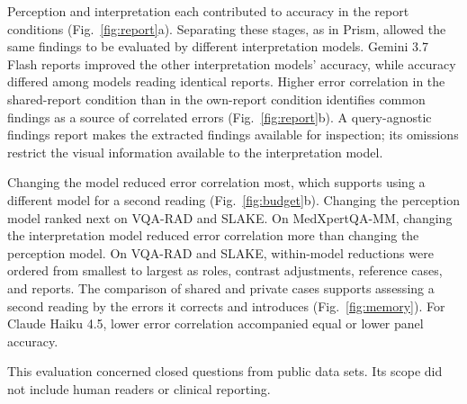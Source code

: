 Perception and interpretation each contributed to accuracy in the report conditions (Fig.~\ref{fig:report}a). Separating these stages, as in Prism, allowed the same findings to be evaluated by different interpretation models.\cite{qiao2024prism} Gemini 3.7 Flash reports improved the other interpretation models' accuracy, while accuracy differed among models reading identical reports. Higher error correlation in the shared-report condition than in the own-report condition identifies common findings as a source of correlated errors (Fig.~\ref{fig:report}b). A query-agnostic findings report makes the extracted findings available for inspection; its omissions restrict the visual information available to the interpretation model.

Changing the model reduced error correlation most, which supports using a different model for a second reading (Fig.~\ref{fig:budget}b). Changing the perception model ranked next on VQA-RAD and SLAKE. On MedXpertQA-MM, changing the interpretation model reduced error correlation more than changing the perception model. On VQA-RAD and SLAKE, within-model reductions were ordered from smallest to largest as roles, contrast adjustments, reference cases, and reports. The comparison of shared and private cases supports assessing a second reading by the errors it corrects and introduces (Fig.~\ref{fig:memory}). For Claude Haiku 4.5, lower error correlation accompanied equal or lower panel accuracy.

This evaluation concerned closed questions from public data sets. Its scope did not include human readers or clinical reporting.
